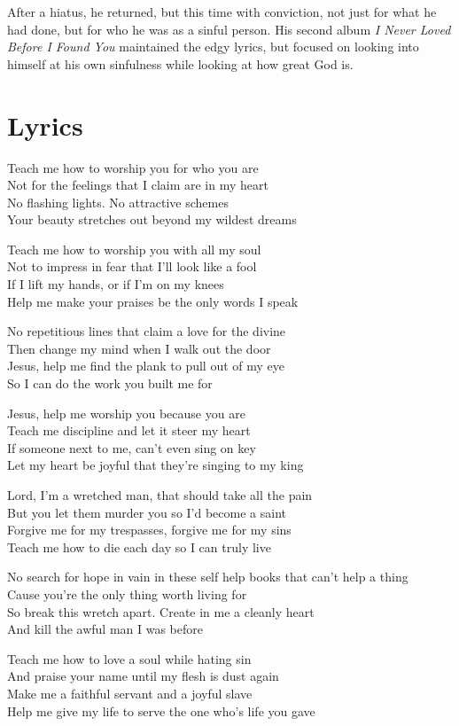 \documentclass[10pt,a4paper,oneside,twocolumn]{book}
\begin{document}
After a hiatus, he returned, but this time with conviction, not just for what he had done, but for who he was as a sinful person. His second album \textit{I Never Loved Before I Found You} maintained the edgy lyrics, but focused on looking into himself at his own sinfulness while looking at how great God is.

\section{Lyrics}
\begin{flushleft}
Teach me how to worship you for who you are\\
Not for the feelings that I claim are in my heart\\
No flashing lights. No attractive schemes\\
Your beauty stretches out beyond my wildest dreams
\medskip

Teach me how to worship you with all my soul\\
Not to impress in fear that I'll look like a fool\\
If I lift my hands, or if I'm on my knees\\
Help me make your praises be the only words I speak
\medskip

No repetitious lines that claim a love for the divine\\
Then change my mind when I walk out the door\\
Jesus, help me find the plank to pull out of my eye\\
So I can do the work you built me for
\medskip

Jesus, help me worship you because you are\\
Teach me discipline and let it steer my heart\\
If someone next to me, can't even sing on key\\
Let my heart be joyful that they're singing to my king
\medskip

Lord, I'm a wretched man, that should take all the pain\\
But you let them murder you so I'd become a saint\\
Forgive me for my trespasses, forgive me for my sins\\
Teach me how to die each day so I can truly live
\medskip

No search for hope in vain in these self help books that can't help a thing\\
Cause you're the only thing worth living for\\
So break this wretch apart. Create in me a cleanly heart\\
And kill the awful man I was before
\medskip

Teach me how to love a soul while hating sin\\
And praise your name until my flesh is dust again\\
Make me a faithful servant and a joyful slave\\
Help me give my life to serve the one who's life you gave
\end{flushleft}
\end{document}
